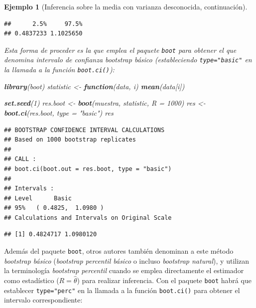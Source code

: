 \documentclass[
]{book}
\newenvironment{Shaded}{\begin{snugshade}}{\end{snugshade}}
\newcommand{\AttributeTok}[1]{\textcolor[rgb]{0.13,0.29,0.53}{#1}}
\newcommand{\ControlFlowTok}[1]{\textcolor[rgb]{0.13,0.29,0.53}{\textbf{#1}}}
\newcommand{\DecValTok}[1]{\textcolor[rgb]{0.00,0.00,0.81}{#1}}
\newcommand{\FunctionTok}[1]{\textcolor[rgb]{0.13,0.29,0.53}{\textbf{#1}}}
\newcommand{\NormalTok}[1]{#1}
\newcommand{\OtherTok}[1]{\textcolor[rgb]{0.56,0.35,0.01}{#1}}
\newcommand{\SpecialCharTok}[1]{\textcolor[rgb]{0.81,0.36,0.00}{\textbf{#1}}}
\newcommand{\StringTok}[1]{\textcolor[rgb]{0.31,0.60,0.02}{#1}}
\theoremstyle{break}
\newtheorem{example}{Ejemplo}[chapter]
\theoremstyle{nonumberplain}
\begin{document}
\begin{example}[Inferencia sobre la media con varianza desconocida, continuación]
\begin{verbatim}
##      2.5%     97.5% 
## 0.4837233 1.1025650
\end{verbatim}

Esta forma de proceder es la que emplea el paquete \texttt{boot} para obtener
el que denomina intervalo de confianza \emph{bootstrap básico}
(estableciendo \texttt{type="basic"} en la llamada a la función \texttt{boot.ci()}):

\begin{Shaded}
\begin{Highlighting}[]
\FunctionTok{library}\NormalTok{(boot)}
\NormalTok{statistic }\OtherTok{\textless{}{-}} \ControlFlowTok{function}\NormalTok{(data, i) }\FunctionTok{mean}\NormalTok{(data[i])}

\FunctionTok{set.seed}\NormalTok{(}\DecValTok{1}\NormalTok{)}
\NormalTok{res.boot }\OtherTok{\textless{}{-}} \FunctionTok{boot}\NormalTok{(muestra, statistic, }\AttributeTok{R =} \DecValTok{1000}\NormalTok{)}
\NormalTok{res }\OtherTok{\textless{}{-}} \FunctionTok{boot.ci}\NormalTok{(res.boot, }\AttributeTok{type =} \StringTok{"basic"}\NormalTok{)}
\NormalTok{res}
\end{Highlighting}
\end{Shaded}

\begin{verbatim}
## BOOTSTRAP CONFIDENCE INTERVAL CALCULATIONS
## Based on 1000 bootstrap replicates
## 
## CALL : 
## boot.ci(boot.out = res.boot, type = "basic")
## 
## Intervals : 
## Level      Basic         
## 95%   ( 0.4825,  1.0980 )  
## Calculations and Intervals on Original Scale
\end{verbatim}

\begin{Shaded}
\end{Shaded}

\begin{verbatim}
## [1] 0.4824717 1.0980120
\end{verbatim}

\end{example}

Además del paquete \texttt{boot}, otros autores también denominan a este método
\emph{bootstrap básico} (\emph{bootstrap percentil básico} o incluso \emph{bootstrap natural}),
y utilizan la terminología \emph{bootstrap percentil} cuando se emplea
directamente el estimador como estadístico (\(R = \hat \theta\)) para
realizar inferencia. Con el paquete \texttt{boot} habrá que establecer \texttt{type="perc"}
en la llamada a la función \texttt{boot.ci()} para obtener el intervalo
correspondiente:
\end{document}
